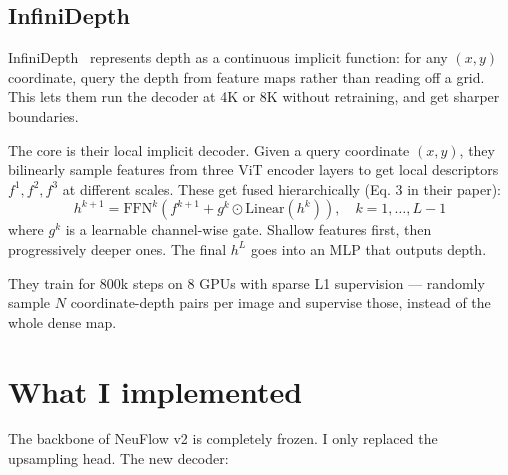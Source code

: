 \documentclass[11pt,a4paper]{article}
\begin{document}
\subsection{InfiniDepth}

InfiniDepth~\cite{yu2026infinidepth} represents depth as a continuous implicit function: for any $(x, y)$ coordinate, query the depth from feature maps rather than reading off a grid. This lets them run the decoder at 4K or 8K without retraining, and get sharper boundaries.

The core is their local implicit decoder. Given a query coordinate $(x,y)$, they bilinearly sample features from three ViT encoder layers to get local descriptors $f^1, f^2, f^3$ at different scales. These get fused hierarchically (Eq. 3 in their paper):
\[
  h^{k+1} = \mathrm{FFN}^k\!\left(f^{k+1} + g^k \odot \mathrm{Linear}(h^k)\right), \quad k = 1,\ldots,L-1
\]
where $g^k$ is a learnable channel-wise gate. Shallow features first, then progressively deeper ones. The final $h^L$ goes into an MLP that outputs depth.

They train for 800k steps on 8 GPUs with sparse L1 supervision --- randomly sample $N$ coordinate-depth pairs per image and supervise those, instead of the whole dense map.

\section{What I implemented}

The backbone of NeuFlow v2 is completely frozen. I only replaced the upsampling head. The new decoder:
\end{document}
